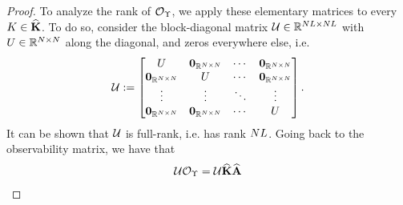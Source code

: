 \begin{proof}
To analyze the rank of $\mathcal{O}_{\Upsilon}$, we apply these elementary matrices to every $K\in\widehat{\mathbf{K}}$. To do so, consider the block-diagonal matrix $\mathcal{U}\in\mathbb{R}^{NL\times NL}$ with $U\in\mathbb{R}^{N\times N}$ along the diagonal, and zeros everywhere else,
i.e.
\begin{align}
 \mathcal{U}:= \begin{bmatrix}
  U   & \mathbf{0}_{\mathbb{R}^{N\times N}} & \cdots & \mathbf{0}_{\mathbb{R}^{N\times N}}\\
  \mathbf{0}_{\mathbb{R}^{N\times N}} & U   & \cdots & \mathbf{0}_{\mathbb{R}^{N\times N}}\\
  \vdots  & \vdots  & \ddots & \vdots\\
  \mathbf{0}_{\mathbb{R}^{N\times N}} & \mathbf{0}_{\mathbb{R}^{N\times N}} & \cdots & U
 \end{bmatrix}.
\end{align}
It can be shown that  $\mathcal{U}$ is full-rank, i.e. has rank $NL$. Going back to the observability matrix, we have that 
\begin{align*}
 \bdU\Obs_{\Tset} &= \bdU\catempK\catdualopC\\

\end{align*}
\end{proof}
